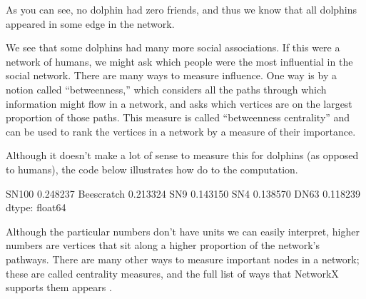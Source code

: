 \documentclass[letterpaper,10pt,english]{jupyterBook}
\begin{document}
\noindent{}

\sphinxAtStartPar
As you can see, no dolphin had zero friends, and thus we know that all dolphins appeared in some edge in the network.

\sphinxAtStartPar
We see that some dolphins had many more social associations.  If this were a network of humans, we might ask which people were the most influential in the social network.  There are many ways to measure influence.  One way is by a notion called “betweenness,” which considers all the paths through which information might flow in a network, and asks which vertices are on the largest proportion of those paths.  This measure is called “betweenness centrality” and can be used to rank the vertices in a network by a measure of their importance.

\sphinxAtStartPar
Although it doesn’t make a lot of sense to measure this for dolphins (as opposed to humans), the code below illustrates how do to the computation.

\begin{sphinxVerbatim}[commandchars=\\\{\}]
      
                            
      
\end{sphinxVerbatim}

\begin{sphinxVerbatim}[commandchars=\\\{\}]
SN100         0.248237
Beescratch    0.213324
SN9           0.143150
SN4           0.138570
DN63          0.118239
dtype: float64
\end{sphinxVerbatim}

\sphinxAtStartPar
Although the particular numbers don’t have units we can easily interpret, higher numbers are vertices that sit along a higher proportion of the network’s pathways.  There are many other ways to measure important nodes in a network; these are called centrality measures, and the full list of ways that NetworkX supports them appears .
\end{document}
